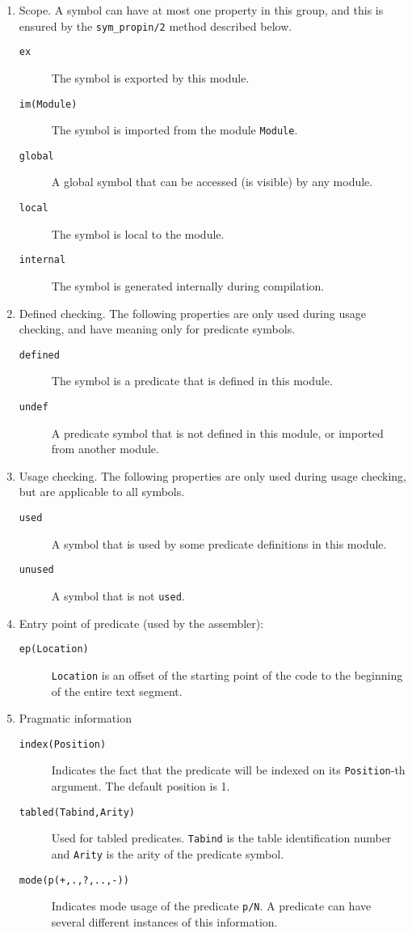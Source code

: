 \begin{enumerate}
\item	Scope.  A symbol can have at most one property in this group,
	and this is ensured by the {\tt sym\_propin/2} method described below.
	\begin{description}
	\item[{\tt ex}]		The symbol is exported by this module.
	\item[{\tt im(Module)}]	The symbol is imported from the module
				{\tt Module}.
	\item[{\tt global}]	A global symbol that can be accessed
				(is visible) by any module.
	\item[{\tt local}]	The symbol is local to the module.
	\item[{\tt internal}]	The symbol is generated internally
				during compilation.
	\end{description}
\item	Defined checking.  The following properties are only used during usage 
	checking, and have meaning only for predicate symbols.
	\begin{description}
	\item[{\tt defined}]	The symbol is a predicate that is defined in
				this module.
	\item[{\tt undef}]	A predicate symbol that is not defined in
				this module, or imported from another module.
	\end{description}
\item	Usage checking.  The following properties are only used during usage 
	checking, but are applicable to all symbols.
	\begin{description}
	\item[{\tt used}]	A symbol that is used by some predicate
				definitions in this module.
	\item[{\tt unused}]	A symbol that is not {\tt used}.
	\end{description}
\item	Entry point of predicate (used by the assembler):
	\begin{description}
	\item[{\tt ep(Location)}]
		{\tt Location} is an offset of the starting point of the
		code to the beginning of the entire text segment.
	\end{description}
\item	Pragmatic information
	\begin{description}
	\item[{\tt index(Position)}]
		Indicates the fact that the predicate will be indexed on
		its {\tt Position}-th argument.  The default position is 1.
	\item[{\tt tabled(Tabind,Arity)}]
		Used for tabled predicates.  {\tt Tabind} is the table
		identification number and {\tt Arity} is the arity of
		the predicate symbol.
	\item[{\tt mode(p(+,.,?,..,-))}]
		Indicates mode usage of the predicate {\tt p/N}.  A predicate
		can have several different instances of this information.
	\end{description}
\end{enumerate}


